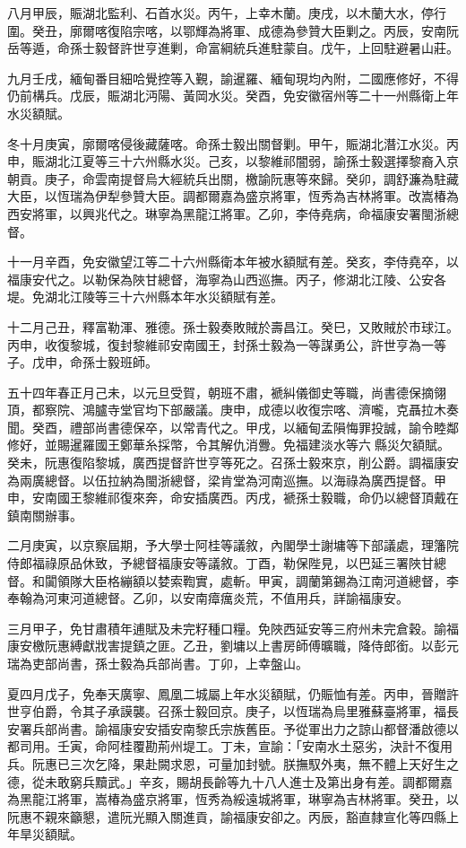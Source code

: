 \begin{pinyinscope}
八月甲辰，賑湖北監利、石首水災。丙午，上幸木蘭。庚戌，以木蘭大水，停行圍。癸丑，廓爾喀復陷宗喀，以鄂輝為將軍、成德為參贊大臣剿之。丙辰，安南阮岳等遁，命孫士毅督許世亨進剿，命富綱統兵進駐蒙自。戊午，上回駐避暑山莊。

九月壬戌，緬甸番目細哈覺控等入覲，諭暹羅、緬甸現均內附，二國應修好，不得仍前構兵。戊辰，賑湖北沔陽、黃岡水災。癸酉，免安徽宿州等二十一州縣衛上年水災額賦。

冬十月庚寅，廓爾喀侵後藏薩喀。命孫士毅出關督剿。甲午，賑湖北潛江水災。丙申，賑湖北江夏等三十六州縣水災。己亥，以黎維祁闇弱，諭孫士毅選擇黎裔入京朝貢。庚子，命雲南提督烏大經統兵出關，檄諭阮惠等來歸。癸卯，調舒濂為駐藏大臣，以恆瑞為伊犁參贊大臣。調都爾嘉為盛京將軍，恆秀為吉林將軍。改嵩椿為西安將軍，以興兆代之。琳寧為黑龍江將軍。乙卯，李侍堯病，命福康安署閩浙總督。

十一月辛酉，免安徽望江等二十六州縣衛本年被水額賦有差。癸亥，李侍堯卒，以福康安代之。以勒保為陜甘總督，海寧為山西巡撫。丙子，修湖北江陵、公安各堤。免湖北江陵等三十六州縣本年水災額賦有差。

十二月己丑，釋富勒渾、雅德。孫士毅奏敗賊於壽昌江。癸巳，又敗賊於市球江。丙申，收復黎城，復封黎維祁安南國王，封孫士毅為一等謀勇公，許世亨為一等子。戊申，命孫士毅班師。

五十四年春正月己未，以元旦受賀，朝班不肅，褫糾儀御史等職，尚書德保摘翎頂，都察院、鴻臚寺堂官均下部嚴議。庚申，成德以收復宗喀、濟嚨，克聶拉木奏聞。癸酉，禮部尚書德保卒，以常青代之。甲戌，以緬甸孟隕悔罪投誠，諭令睦鄰修好，並賜暹羅國王鄭華糸採幣，令其解仇消釁。免福建淡水等六縣災欠額賦。癸未，阮惠復陷黎城，廣西提督許世亨等死之。召孫士毅來京，削公爵。調福康安為兩廣總督。以伍拉納為閩浙總督，梁肯堂為河南巡撫。以海祿為廣西提督。甲申，安南國王黎維祁復來奔，命安插廣西。丙戌，褫孫士毅職，命仍以總督頂戴在鎮南關辦事。

二月庚寅，以京察屆期，予大學士阿桂等議敘，內閣學士謝墉等下部議處，理籓院侍郎福祿原品休致，予總督福康安等議敘。丁酉，勒保陛見，以巴延三署陜甘總督。和闐領隊大臣格繃額以婪索鞫實，處斬。甲寅，調蘭第錫為江南河道總督，李奉翰為河東河道總督。乙卯，以安南瘴癘炎荒，不值用兵，詳諭福康安。

三月甲子，免甘肅積年逋賦及未完籽種口糧。免陜西延安等三府州未完倉穀。諭福康安檄阮惠縛獻戕害提鎮之匪。乙丑，劉墉以上書房師傅曠職，降侍郎銜。以彭元瑞為吏部尚書，孫士毅為兵部尚書。丁卯，上幸盤山。

夏四月戊子，免奉天廣寧、鳳凰二城屬上年水災額賦，仍賑恤有差。丙申，晉贈許世亨伯爵，令其子承謨襲。召孫士毅回京。庚子，以恆瑞為烏里雅蘇臺將軍，福長安署兵部尚書。諭福康安安插安南黎氏宗族舊臣。予從軍出力之諒山都督潘啟德以都司用。壬寅，命阿桂覆勘荊州堤工。丁未，宣諭：「安南水土惡劣，決計不復用兵。阮惠已三次乞降，果赴闕求恩，可量加封號。朕撫馭外夷，無不體上天好生之德，從未敢窮兵黷武。」辛亥，賜胡長齡等九十八人進士及第出身有差。調都爾嘉為黑龍江將軍，嵩椿為盛京將軍，恆秀為綏遠城將軍，琳寧為吉林將軍。癸丑，以阮惠不親來籲懇，遣阮光顯入關進貢，諭福康安卻之。丙辰，豁直隸宣化等四縣上年旱災額賦。


\end{pinyinscope}
